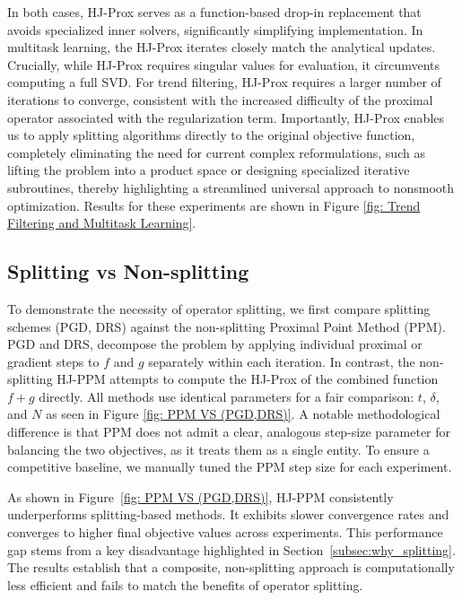 \documentclass{article}
\theoremstyle{plain}
\theoremstyle{definition}
\theoremstyle{remark}
\begin{document}
In both cases, HJ-Prox serves as a function-based drop-in replacement that avoids specialized inner solvers, significantly simplifying implementation. In multitask learning, the HJ-Prox iterates closely match the analytical updates. Crucially, while HJ-Prox requires singular values for evaluation, it circumvents computing a full SVD. For trend filtering, HJ-Prox requires a larger number of iterations to converge, consistent with the increased difficulty of the proximal operator associated with the regularization term. Importantly, HJ-Prox enables us to apply splitting algorithms directly to the original objective function, completely eliminating the need for current complex reformulations, such as lifting the problem into a product space or designing specialized iterative subroutines, thereby highlighting a streamlined universal approach to nonsmooth optimization. Results for these experiments are shown in Figure \ref{fig: Trend Filtering and Multitask Learning}. 

\subsection{Splitting vs Non-splitting}
\label{subsec:split_vs_nonsplit}

To demonstrate the necessity of operator splitting, we first compare splitting schemes (PGD, DRS) against the non-splitting Proximal Point Method (PPM). PGD and DRS, decompose the problem by applying individual proximal or gradient steps to $f$ and $g$ separately within each iteration. In contrast, the non-splitting HJ-PPM attempts to compute the HJ-Prox of the combined function $f+g$ directly. All methods use identical parameters for a fair comparison: $t$, $\delta$, and $N$ as seen in Figure \ref{fig: PPM VS (PGD,DRS)}. A notable methodological difference is that PPM does not admit a clear, analogous step-size parameter for balancing the two objectives, as it treats them as a single entity. To ensure a competitive baseline, we manually tuned the PPM step size for each experiment.

As shown in Figure~\ref{fig: PPM VS (PGD,DRS)}, HJ-PPM consistently underperforms splitting-based methods. It exhibits slower convergence rates and converges to higher final objective values across experiments. This performance gap stems from a key disadvantage highlighted in Section~\ref{subsec:why_splitting}. The results establish that a composite, non-splitting approach is computationally less efficient and fails to match the benefits of operator splitting.
\end{document}
